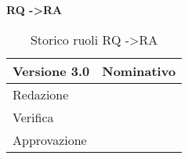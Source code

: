 \textbf{RQ -\textgreater RA}

\begin{table}[h!]
\begin{center}

\begin{tabular}{p{} p{}}
\toprule
\textbf{Versione 3.0}	&	\textbf{Nominativo}\\
\midrule
\midrule
Redazione	&	\EZ \\
\midrule
Verifica &	\SL	\\
\midrule
Approvazione	&	\MB	\\
\bottomrule
\end{tabular}
\caption{Storico ruoli RQ -\textgreater RA}
\label{tabVers4}
\end{center}
\end{table}